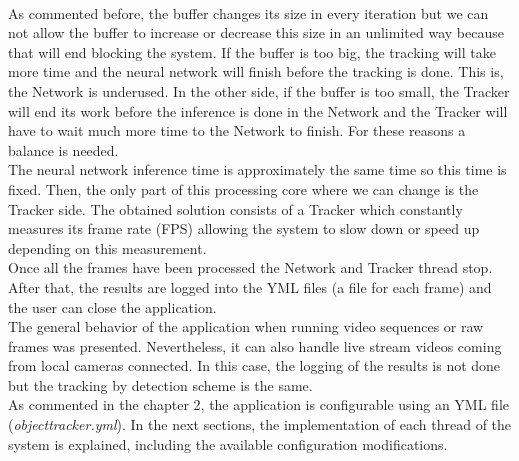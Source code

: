 \\As commented before, the buffer changes its size in every iteration but we can not allow the buffer to increase or decrease this size in an unlimited way because that will end blocking the system. If the buffer is too big, the tracking will take more time and the neural network will finish before the tracking is done. This is, the Network is underused. In the other side, if the buffer is too small, the Tracker will end its work before the inference is done in the Network and the Tracker will have to wait much more time to the Network to finish. For these reasons a balance is needed.\\
The neural network inference time is approximately the same time so this time is fixed. Then, the only part of this processing core where we can change is the Tracker side. The obtained solution consists of a Tracker which constantly measures its frame rate (FPS) allowing the system to slow down or speed up depending on this measurement.\\
Once all the frames have been processed the Network and Tracker thread stop. After that, the results are logged into the YML files (a file for each frame) and the user can close the application.\\
The general behavior of the application when running video sequences or raw frames was presented. Nevertheless, it can also handle live stream videos coming from local cameras connected. In this case, the logging of the results is not done but the tracking by detection scheme is the same.\\
As commented in the chapter 2, the application is configurable using an YML file (\textit{objecttracker.yml}). In the next sections, the implementation of each thread of the system is explained, including the available configuration modifications.

